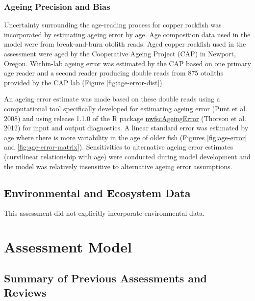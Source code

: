 \documentclass[11pt,
  english,
  letterpaper,
]{article}
\begin{document}
\hypertarget{ageing-precision-and-bias}{%
\subsubsection{Ageing Precision and Bias}\label{ageing-precision-and-bias}}

Uncertainty surrounding the age-reading process for copper rockfish was incorporated by estimating ageing error by age. Age composition data used in the model were from break-and-burn otolith reads. Aged copper rockfish used in the assessment were aged by the Cooperative Ageing Project (CAP) in Newport, Oregon. Within-lab ageing error was estimated by the CAP based on one primary age reader and a second reader producing double reads from 875 otoliths provided by the CAP lab (Figure \ref{fig:age-error-dist}).

An ageing error estimate was made based on these double reads using a computational tool specifically developed for estimating ageing error (Punt et al. 2008) and using release 1.1.0 of the R package \href{https://github.com/nwfsc-assess/nwfscAgeingError}{nwfscAgeingError} (Thorson et al. 2012) for input and output diagnostics. A linear standard error was estimated by age where there is more variability in the age of older fish (Figures \ref{fig:age-error} and \ref{fig:age-error-matrix}). Sensitivities to alternative ageing error estimates (curvilinear relationship with age) were conducted during model development and the model was relatively insensitive to alternative ageing error assumptions.

\hypertarget{environmental-and-ecosystem-data}{%
\subsection{Environmental and Ecosystem Data}\label{environmental-and-ecosystem-data}}

This assessment did not explicitly incorporate environmental data.

\hypertarget{assessment-model}{%
\section{Assessment Model}\label{assessment-model}}

\hypertarget{summary-of-previous-assessments-and-reviews}{%
\subsection{Summary of Previous Assessments and Reviews}\label{summary-of-previous-assessments-and-reviews}}
\end{document}
